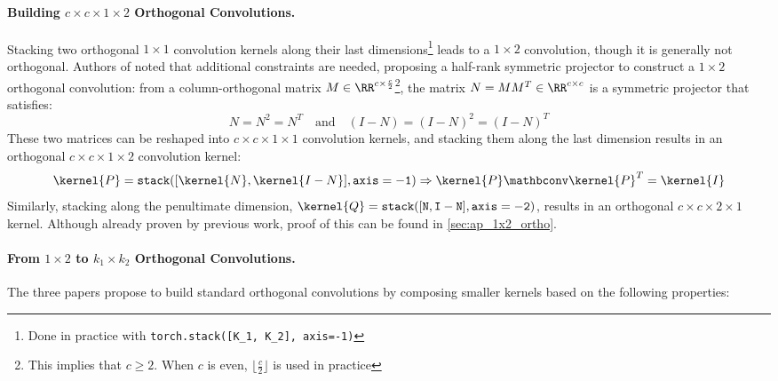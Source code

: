     \paragraph{Building $c\times c \times 1 \times 2$ Orthogonal Convolutions.}
    Stacking two orthogonal $1\times 1$ convolution kernels along their last dimensions\footnote{Done in practice with \texttt{torch.stack([K\_1, K\_2], axis=-1)}} leads to a $1 \times 2$ convolution, though it is generally not orthogonal. Authors of \cite{xiao_dynamical_2018, su_scaling-up_2021} noted that additional constraints are needed, proposing a half-rank symmetric projector to construct a $1 \times 2$ orthogonal convolution: from a column-orthogonal matrix $M \in \RR^{c \times \frac{c}{2}}$\footnote{This implies that $c\geq2$. When $c$ is even, $\lfloor\frac{c}{2}\rfloor$ is used in practice}, the matrix $N = M M^T \in \RR^{c \times c}$ is a symmetric projector that satisfies:
        \[
            N = N^2 = N^T \quad \text{and} \quad (I - N) = (I - N)^2 = (I - N)^T
        \]
    These two matrices can be reshaped into $c \times c \times 1 \times 1$ convolution kernels, and stacking them along the last dimension results in an orthogonal $c \times c \times 1 \times 2$ convolution kernel:
        \[
        \kernel{P} = \mathtt{stack(}[\kernel{N}, \kernel{I - N}]\mathtt{, axis=-1)} \Rightarrow \kernel{P} \mathbconv \kernel{P}^T = \kernel{I}
        \]
    Similarly, stacking along the penultimate dimension, $\kernel{Q} = \mathtt{stack([N, I - N], axis=-2)}$, results in an orthogonal $c \times c \times 2 \times 1$ kernel. 
    Although already proven by previous work, proof of this can be found in \cref{sec:ap_1x2_ortho}.
    
    \paragraph{From $1 \times 2$ to $k_1 \times k_2$ Orthogonal Convolutions.}  
    The three papers propose to build standard orthogonal convolutions by composing smaller kernels based on the following properties:
    

